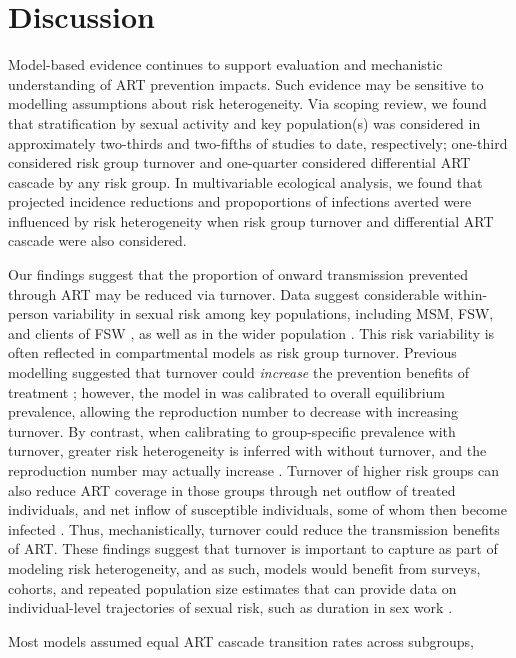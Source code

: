 \section{Discussion}\label{sr.disc}
Model-based evidence continues to support
evaluation and mechanistic understanding of ART prevention impacts.
Such evidence may be sensitive to modelling assumptions about risk heterogeneity.
Via scoping review, we found that stratification by sexual activity and key population(s)
was considered in approximately two-thirds and two-fifths of studies to date, respectively;
one-third considered risk group turnover and one-quarter considered differential ART cascade by any risk group.
In multivariable ecological analysis, we found that
projected incidence reductions and propoportions of infections averted were influenced by
risk heterogeneity when risk group turnover and differential ART cascade were also considered.
\par
Our findings suggest that the proportion of onward transmission prevented through ART
may be reduced via turnover.
Data suggest considerable within-person variability in sexual risk among key populations,
including MSM, FSW, and clients of FSW \cite{Fazito2012,Romero-Severson2012,Roberts2020},
as well as in the wider population \cite{Houle2018}.
This risk variability is often reflected in compartmental models as risk group turnover.
Previous modelling suggested that
turnover could \emph{increase} the prevention benefits of treatment \cite{Henry2015};
however, the model in \cite{Henry2015} was calibrated to overall equilibrium prevalence,
allowing the reproduction number to decrease with increasing turnover.
By contrast, when calibrating to group-specific prevalence with turnover,
greater risk heterogeneity is inferred with \vs without turnover,
and the reproduction number may actually increase \cite{Knight2020}.
Turnover of higher risk groups can also reduce ART coverage in those groups through
net outflow of treated individuals, and net inflow of susceptible individuals,
some of whom then become infected \cite{Knight2020}.
Thus, mechanistically, turnover could reduce the transmission benefits of ART.
These findings suggest that turnover is important to capture as part of modeling risk heterogeneity,
and as such, models would benefit from surveys, cohorts, and repeated population size estimates
that can provide data on individual-level trajectories of sexual risk,
such as duration in sex work \cite{Watts2010}.
\par
Most models assumed equal ART cascade transition rates across subgroups,
